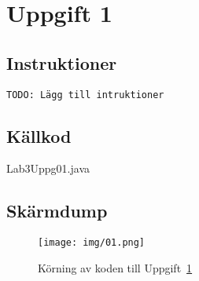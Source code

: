 \section{Uppgift 1}\label{sec:uppg01}

\subsection{Instruktioner}
\begin{verbatim}
TODO: Lägg till intruktioner
\end{verbatim}


\subsection{Källkod}
\caption{Lab3Uppg01.java}
\label{src:uppg01}


\subsection{Skärmdump}
\begin{figure}[htbp]
    \centering
        \texttt{[image: img/01.png]}
    \caption{Körning av koden till Uppgift~\ref{sec:uppg01}}
    \label{fig:uppg01-screenshot}
\end{figure}

